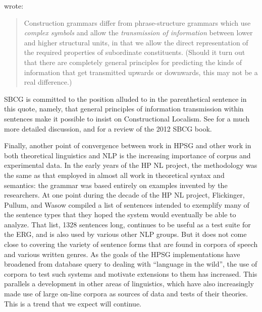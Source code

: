 \documentclass[output=paper
 	        ,biblatex
                ,babelshorthands
                ,newtxmath
                ,draftmode
                ,colorlinks, citecolor=brown
]{langscibook}
\begin{document}
\citet[]{Fillmore88a} wrote:
\begin{quote}
Construction grammars differ from phrase-structure grammars which use \emph{complex symbols} and
allow the \emph{transmission of information} between lower and higher structural units, in that we
allow the direct representation of the required properties of subordinate constituents.  (Should it
turn out that there are completely general principles for predicting the kinds of information that
get transmitted upwards or downwards, this may not be a real difference.) \citep[]{Fillmore88a}
\end{quote}
SBCG is committed to the position alluded to in the parenthetical sentence in this quote, namely, that general principles of information transmission within sentences make it possible to insist on Constructional Localism.   See  for a much more detailed discussion, and \citet{VanEynde2015a} for a review of the 2012 SBCG book.\label{page-sbcg-end}  

Finally, another point of convergence between work in HPSG and other work in both theoretical
linguistics and NLP is the increasing importance of corpus and experimental data. In the early years
of the HP NL project, the methodology was the same as that employed in almost all work in
theoretical syntax and semantics: the grammar was based entirely on examples invented by the
researchers.  At one point during the decade of the HP NL project, Flickinger, Pullum, and Wasow
compiled a list of sentences intended to exemplify many of the sentence types that they hoped the
system would eventually be able to analyze.  That list, 1328 sentences long, continues to be useful
as a test suite for the ERG, and is also used by various other NLP groups.  But it does not come
close to covering the variety of sentence forms that are found in corpora of speech and various
written genres.  As the goals of the HPSG implementations have broadened from database query to
dealing with ``language in the wild'', the use of corpora to test such systems and motivate
extensions to them has increased.  This parallels a development in other areas of linguistics, which
have also increasingly made use of large on-line corpora as sources of data and tests of their
theories.  This is a trend that we expect will continue.
\end{document}
